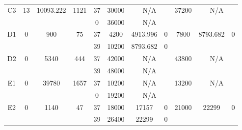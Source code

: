 \begin{sidewaystable}
\begin{tabular}{c||c|c|c||c|c|c|c||c|c|c}
         &
        
      \\
      \hline
      \multirow{2}{*}{C3} &
      \multirow{2}{*}{13} &
      \multirow{2}{*}{10093.222} &
      \multirow{2}{*}{1121} &
      37 &
      30000 &
        \multicolumn{2}{|c||}{N/A} &
      \multirow{2}{*}{37200} &
        \multicolumn{2}{c}{\multirow{2}{*}{N/A}}
      \\
      \cline{5-8}
       &
       &
       &
       &
      0 &
      36000 &
        \multicolumn{2}{|c||}{N/A} &
      
        
      \\
      \hline
      \multirow{2}{*}{D1} &
      \multirow{2}{*}{0} &
      \multirow{2}{*}{900} &
      \multirow{2}{*}{75} &
      37 &
      4200 &
        4913.996 &
        0 &
      \multirow{2}{*}{7800} &
        \multirow{2}{*}{8793.682} &
        \multirow{2}{*}{0}
      \\
      \cline{5-8}
       &
       &
       &
       &
      39 &
      10200 &
        8793.682 &
        0 &
      
         &
        
      \\
      \hline
      \multirow{2}{*}{D2} &
      \multirow{2}{*}{0} &
      \multirow{2}{*}{5340} &
      \multirow{2}{*}{444} &
      37 &
      42000 &
        \multicolumn{2}{|c||}{N/A} &
      \multirow{2}{*}{43800} &
        \multicolumn{2}{c}{\multirow{2}{*}{N/A}}
      \\
      \cline{5-8}
       &
       &
       &
       &
      39 &
      48000 &
        \multicolumn{2}{|c||}{N/A} &
      
        
      \\
      \hline
      \multirow{2}{*}{E1} &
      \multirow{2}{*}{0} &
      \multirow{2}{*}{39780} &
      \multirow{2}{*}{1657} &
      37 &
      10200 &
        \multicolumn{2}{|c||}{N/A} &
      \multirow{2}{*}{13200} &
        \multicolumn{2}{c}{\multirow{2}{*}{N/A}}
      \\
      \cline{5-8}
       &
       &
       &
       &
      0 &
      19200 &
        \multicolumn{2}{|c||}{N/A} &
      
        
      \\
      \hline
      \multirow{2}{*}{E2} &
      \multirow{2}{*}{0} &
      \multirow{2}{*}{1140} &
      \multirow{2}{*}{47} &
      37 &
      18000 &
        17157 &
        0 &
      \multirow{2}{*}{21000} &
        \multirow{2}{*}{22299} &
        \multirow{2}{*}{0}
      \\
      \cline{5-8}
       &
       &
       &
       &
      39 &
      26400 &
        22299 &
        0 &
      

\end{tabular}
\end{sidewaystable}
